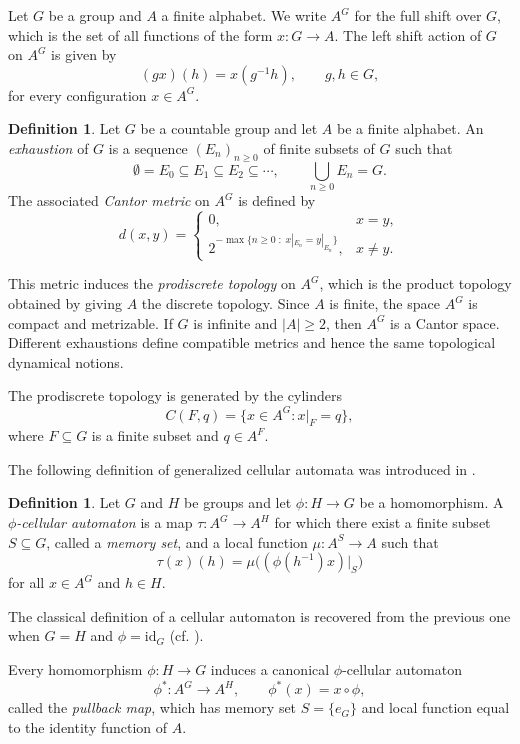 \documentclass[12pt,a4paper]{article}
\theoremstyle{definition}
\newtheorem{definition}[theorem]{Definition}
\theoremstyle{remark}
\begin{document}
Let $G$ be a group and $A$ a finite alphabet. We write $A^G$ for the full shift over $G$, which is the set of all functions of the form $x : G \to A$.  The left shift action of $G$ on $A^G$ is given by
\[
(gx)(h)=x(g^{-1}h),\qquad g,h\in G,
\]
for every configuration $x\in A^G$.

\begin{definition}\label{def:generalized-cantor-metric}
Let $G$ be a countable group and let $A$ be a finite alphabet. An \emph{exhaustion} of $G$ is a sequence $(E_n)_{n\geq 0}$ of finite subsets of $G$ such that
\[
\emptyset=E_0\subseteq E_1\subseteq E_2\subseteq \cdots,
\qquad
\bigcup_{n\geq 0}E_n=G.
\]
The associated \emph{Cantor metric} on $A^G$ is defined by
\[
d(x,y)=
\begin{cases}
0, & x=y,\\[2mm]
2^{-\max\{n\geq 0 \; : \; x|_{E_n}=y|_{E_n}\}}, & x\neq y.
\end{cases}
\]
\end{definition}

This metric induces the \emph{prodiscrete topology} on $A^G$, which is the product topology obtained by giving $A$ the discrete topology. Since $A$ is finite, the space $A^G$ is compact and metrizable. If $G$ is infinite and $|A|\geq 2$, then $A^G$ is a Cantor space. Different exhaustions define compatible metrics and hence the same topological dynamical notions.

The prodiscrete topology is generated by the cylinders
\[
C(F,q)=\{x\in A^G:x|_F=q\},
\]
where $F\subseteq G$ is a finite subset and $q\in A^F$.

The following definition of generalized cellular automata was introduced in \cite{AlonsoAngelAlejandro}.

\begin{definition}
Let $G$ and $H$ be groups and let $\phi:H\to G$ be a homomorphism. A \emph{$\phi$-cellular automaton} is a map $\tau:A^G\to A^H$ for which there exist a finite subset $S\subseteq G$, called a \emph{memory set}, and a local function $\mu:A^S\to A$ such that
\[
\tau(x)(h)=\mu\big((\phi(h^{-1})x)|_S\big)
\]
for all $x\in A^G$ and $h\in H$.
\end{definition}

The classical definition of a cellular automaton is recovered from the previous one when $G=H$ and $\phi = \text{id}_G$ (cf. \cite[Def. 1.4.1]{CSC10}).

Every homomorphism $\phi:H\to G$ induces a canonical $\phi$-cellular automaton
\[
\phi^*:A^G\to A^H,
\qquad
\phi^*(x)=x\circ\phi,
\]
called the \emph{pullback map}, which has memory set $S=\{e_G\}$ and local function equal to the identity function of $A$.
\end{document}
